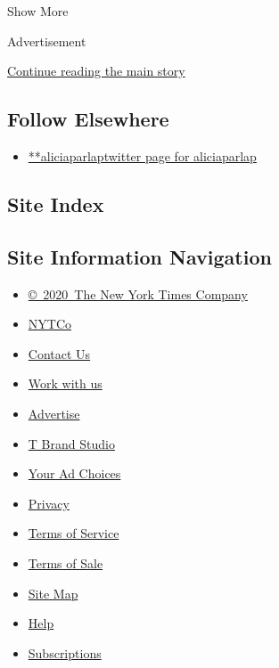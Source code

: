 Show More

Advertisement

\protect\hyperlink{after-mid2}{Continue reading the main story}

\hypertarget{follow-elsewhere}{%
\subsection{Follow Elsewhere}\label{follow-elsewhere}}

\begin{itemize}
\tightlist
\item
  \href{https://twitter.com/aliciaparlap}{**aliciaparlaptwitter page for
  aliciaparlap}
\end{itemize}

\hypertarget{site-index}{%
\subsection{Site Index}\label{site-index}}

\hypertarget{site-information-navigation}{%
\subsection{Site Information
Navigation}\label{site-information-navigation}}

\begin{itemize}
\tightlist
\item
  \href{https://help.nytimes3xbfgragh.onion/hc/en-us/articles/115014792127-Copyright-notice}{©~2020~The
  New York Times Company}
\end{itemize}

\begin{itemize}
\tightlist
\item
  \href{https://www.nytco.com/}{NYTCo}
\item
  \href{https://help.nytimes3xbfgragh.onion/hc/en-us/articles/115015385887-Contact-Us}{Contact
  Us}
\item
  \href{https://www.nytco.com/careers/}{Work with us}
\item
  \href{https://nytmediakit.com/}{Advertise}
\item
  \href{http://www.tbrandstudio.com/}{T Brand Studio}
\item
  \href{https://www.nytimes3xbfgragh.onion/privacy/cookie-policy\#how-do-i-manage-trackers}{Your
  Ad Choices}
\item
  \href{https://www.nytimes3xbfgragh.onion/privacy}{Privacy}
\item
  \href{https://help.nytimes3xbfgragh.onion/hc/en-us/articles/115014893428-Terms-of-service}{Terms
  of Service}
\item
  \href{https://help.nytimes3xbfgragh.onion/hc/en-us/articles/115014893968-Terms-of-sale}{Terms
  of Sale}
\item
  \href{https://spiderbites.nytimes3xbfgragh.onion}{Site Map}
\item
  \href{https://help.nytimes3xbfgragh.onion/hc/en-us}{Help}
\item
  \href{https://www.nytimes3xbfgragh.onion/subscription?campaignId=37WXW}{Subscriptions}
\end{itemize}
